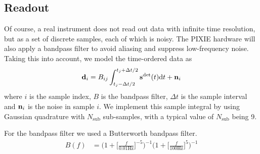 \documentclass{article}
\renewcommand{\vec}[1]{{\bf #1}}
\begin{document}
\subsection{Readout}
Of course, a real instrument does not read out data with infinite
time resolution, but as a set of discrete samples, each of which is
noisy. The PIXIE hardware will also apply a bandpass filter to avoid
aliasing and suppress low-frequency noise. Taking this into account,
we model the time-ordered data as
\begin{align}
	\vec d_i = B_{ij} \int_{t_j-\Delta t/2}^{t_j+\Delta t/2} \vec s^\textrm{det}(t) \textrm{d}t + \vec n_i
\end{align}
where $i$ is the sample index, $B$ is the bandpass filter, $\Delta t$ is the sample
interval and $\vec n_i$ is the noise in sample $i$. We implement this
sample integral by using Gaussian quadrature with $N_\textrm{sub}$ sub-samples,
with a typical value of $N_\textrm{sub}$ being 9.

For the bandpass filter we used a Butterworth bandpass filter.
\begin{align}
	B(f) &= \Big(1+\Big[\frac{f}{0.01\textrm{Hz}}\Big]^{-5}\Big)^{-1}
		\Big(1+\Big[\frac{f}{100\textrm{Hz}}\Big]^{5}\Big)^{-1}
\end{align}
\end{document}
